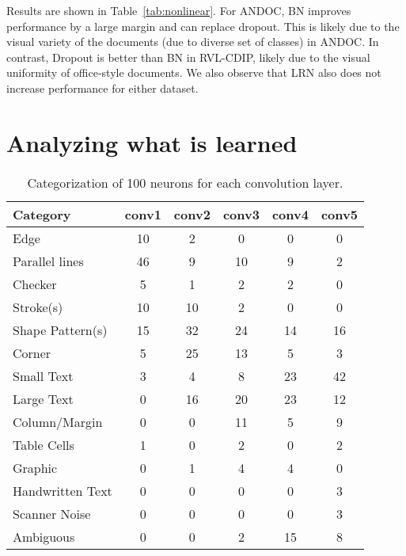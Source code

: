 \documentclass[10pt, conference, compsocconf]{IEEEtran}
\newcommand{\squeezeup}{\vspace{-2.5mm}}
\begin{document}
Results are shown in Table~\ref{tab:nonlinear}.
For ANDOC, BN improves performance by a large margin and can replace dropout.
This is likely due to the visual variety of the documents (due to diverse set of classes) in ANDOC.
In contrast, Dropout is better than BN in RVL-CDIP, likely due to the visual uniformity of office-style documents.
We also observe that LRN also does not increase performance for either dataset.



\section{Analyzing what is learned}

\begin{table}
\centering

\begin{tabular}{|l|c|c|c|c|c|}
\hline
Category          & conv1 & conv2 & conv3 & conv4 & conv5 \\
\hline
Edge              & 10    & 2     & 0     & 0     & 0     \\
Parallel lines    & 46    & 9     & 10    & 9     & 2     \\
Checker           & 5     & 1     & 2     & 2     & 0     \\
Stroke(s)         & 10    & 10    & 2     & 0     & 0     \\
Shape Pattern(s)  & 15    & 32    & 24    & 14    & 16    \\
Corner            & 5     & 25    & 13    & 5     & 3     \\
Small Text        & 3     & 4     & 8     & 23    & 42    \\
Large Text        & 0     & 16    & 20    & 23    & 12    \\
Column/Margin     & 0     & 0     & 11    & 5     & 9     \\
Table Cells       & 1     & 0     & 2     & 0     & 2     \\
Graphic           & 0     & 1     & 4     & 4     & 0     \\
Handwritten Text  & 0     & 0     & 0     & 0     & 3     \\
Scanner Noise     & 0     & 0     & 0     & 0     & 3     \\
Ambiguous        & 0     & 0     & 2     & 15    & 8     \\
\hline
\end{tabular}

\caption{Categorization of 100 neurons for each convolution layer.}
\label{tab:neurons}
\squeezeup
\end{table}
\end{document}
